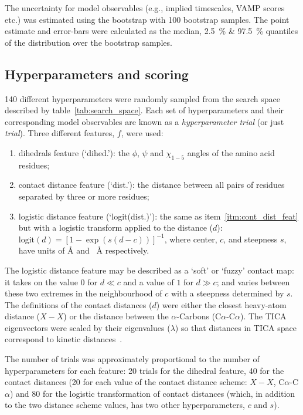 \documentclass[journal=jacsat,manuscript=article]{achemso}
\begin{document}
The uncertainty for model observables (e.g., implied timescales, VAMP scores etc.) was estimated using the bootstrap with \num{100} bootstrap samples. The point estimate and error-bars  were calculated as the median,   \SI{2.5}{\percent} \& \SI{97.5}{\percent} quantiles of the distribution over the bootstrap samples.

\subsection{Hyperparameters and scoring}
\num{140} different hyperparameters were randomly sampled from the search space described by table~\ref{tab:search_space}. Each set of hyperparameters and their corresponding model observables are known as a \emph{hyperparameter trial} (or just \emph{trial}). Three different features, $f$, were used: 
\begin{enumerate}
    \item dihedrals feature (`dihed.'): the $\phi$, $\psi$ and $\chi_{1-5}$ angles of the amino acid residues;
    \item contact distance feature (`dist.'): the distance between all pairs of residues separated by three or more residues; \label{itm:cont_dist_feat}
    \item logistic distance feature (`logit(dist.)'): the same as item~\ref{itm:cont_dist_feat} but with a logistic transform applied to the distance ($d$): $\mathrm{logit}(d) = [1-\exp{(s(d-c))}]^{-1}$, where center, $c$, and steepness $s$,  have units of \si{\angstrom} and \si{\per\angstrom} respectively.
\end{enumerate}
The logistic distance feature may be described as a `soft' or `fuzzy' contact map: it takes on the value $0$ for $d \ll c$ and a value of $1$ for $d\gg c$; and varies between these two extremes in the neighbourhood of $c$ with a steepness determined by $s$. The definitions of the contact distances ($d$) were either the closest heavy-atom distance ($X-X$) or the distance between the $\alpha$-Carbons (C$\alpha$-C$\alpha$). The TICA eigenvectors were scaled by their eigenvalues ($\lambda$) so that distances in TICA space correspond to kinetic distances~\cite{noeKineticDistanceKinetic2015}.

The number of trials was approximately proportional to the number of hyperparameters for each feature: 20 trials for the dihedral feature, 40 for the contact distances (20 for each value of the contact distance scheme: $X-X$,  C$\alpha$-C$\alpha$) and 80 for the logistic transformation of contact distances (which, in addition to the two distance scheme values, has two other hyperparameters, $c$ and $s$). 
\end{document}
